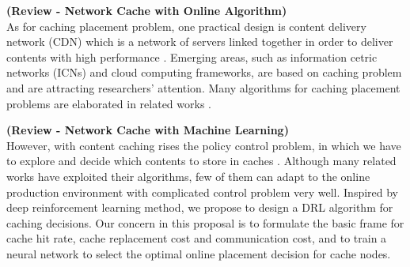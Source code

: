 \documentclass{article}
\begin{document}
  \textbf{(Review - Network Cache with Online Algorithm)}\\
  As for caching placement problem, one practical design is content delivery network (CDN) which is a network of servers linked together in order to deliver contents with high performance \cite{cloudflare}. Emerging areas, such as information cetric networks (ICNs) and cloud computing frameworks, \cite{ref1,ref2,ref3,ref4} are based on caching problem and are attracting researchers' attention. Many algorithms for caching placement problems are elaborated in related works \cite{dl-mec,dl-icn,expert-cdn}.
  
  \textbf{(Review - Network Cache with Machine Learning)}\\

  However, with content caching rises the policy control problem, in which we have to explore and decide which contents to store in caches \cite{DBLP:journals/corr/abs-1712-08132}. Although many related works have exploited their algorithms, few of them can adapt to the online production environment with complicated control problem very well. Inspired by deep reinforcement learning method, we propose to design a DRL algorithm for caching decisions. Our concern in this proposal is to formulate the basic frame for cache hit rate, cache replacement cost and communication cost, and to train a neural network to select the optimal online placement decision for cache nodes. 



\end{document}
